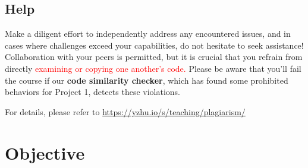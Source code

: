\documentclass[11pt]{article}
\begin{document}
\subsection{Help}

Make a diligent effort to independently address any encountered issues, and in cases where challenges exceed your capabilities, do not hesitate to seek assistance! Collaboration with your peers is permitted, but it is crucial that you refrain from directly \textcolor{red}{examining or copying one another's code.}  Please be aware that you'll fail the course if our \textbf{code similarity checker}, which has found some prohibited behaviors for Project 1, detects these violations.

For details, please refer to \url{https://yzhu.io/s/teaching/plagiarism/}

\clearpage

\section{Objective}
\end{document}
